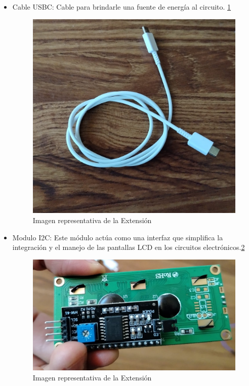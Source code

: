     \begin{itemize}
        \item Cable USBC: Cable para brindarle una fuente de energía al circuito.  \ref{fig:USBC}
    
          \begin{figure}[H]
            \centering
            \includegraphics[trim = {0mm 0mm 0mm 0mm},clip,scale=0.1]{12/Img/cableUsbc.jpg}
            \caption{Imagen representativa de la Extensión}
            \label{fig:USBC}
        \end{figure}
    \end{itemize}
    
    \begin{itemize}
        \item Modulo I2C: Este módulo actúa como una interfaz que simplifica la integración y el manejo de las pantallas LCD en los circuitos electrónicos.\ref{fig:modulo}
    
          \begin{figure}[H]
            \centering
            \includegraphics[trim = {0mm 0mm 0mm 0mm},clip,scale=0.15]{12/Img/moduloI2C.jpg}
            \caption{Imagen representativa de la Extensión}
            \label{fig:modulo}
        \end{figure}
    \end{itemize}
    
